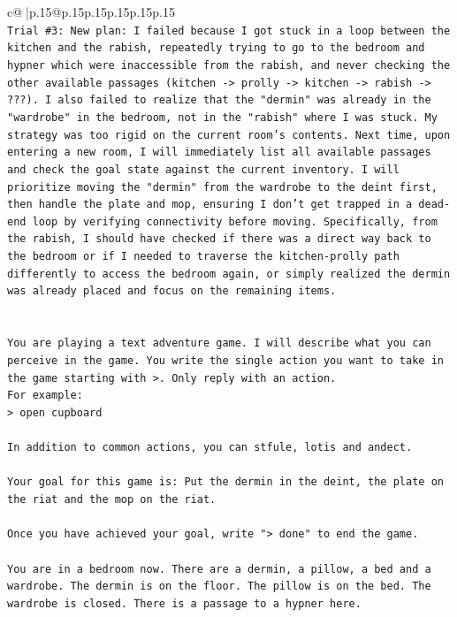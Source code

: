 \documentclass{article}
\begin{document}
{\begin{supertabular}{c@{$\;$}|p{.15\linewidth}@{}p{.15\linewidth}p{.15\linewidth}p{.15\linewidth}p{.15\linewidth}p{.15\linewidth}}
{{{\\ 
\texttt{Trial \#3: New plan: I failed because I got stuck in a loop between the kitchen and the rabish, repeatedly trying to go to the bedroom and hypner which were inaccessible from the rabish, and never checking the other available passages (kitchen {-}> prolly {-}> kitchen {-}> rabish {-}> ???). I also failed to realize that the "dermin" was already in the "wardrobe" in the bedroom, not in the "rabish" where I was stuck. My strategy was too rigid on the current room's contents. Next time, upon entering a new room, I will immediately list all available passages and check the goal state against the current inventory. I will prioritize moving the "dermin" from the wardrobe to the deint first, then handle the plate and mop, ensuring I don't get trapped in a dead{-}end loop by verifying connectivity before moving. Specifically, from the rabish, I should have checked if there was a direct way back to the bedroom or if I needed to traverse the kitchen{-}prolly path differently to access the bedroom again, or simply realized the dermin was already placed and focus on the remaining items.} \\
\\ 
\\ 
\texttt{You are playing a text adventure game. I will describe what you can perceive in the game. You write the single action you want to take in the game starting with >. Only reply with an action.} \\
\texttt{For example:} \\
\texttt{> open cupboard} \\
\\ 
\texttt{In addition to common actions, you can stfule, lotis and andect.} \\
\\ 
\texttt{Your goal for this game is: Put the dermin in the deint, the plate on the riat and the mop on the riat.} \\
\\ 
\texttt{Once you have achieved your goal, write "> done" to end the game.} \\
\\ 
\texttt{You are in a bedroom now. There are a dermin, a pillow, a bed and a wardrobe. The dermin is on the floor. The pillow is on the bed. The wardrobe is closed. There is a passage to a hypner here.} \\
            }
        }
    }
     \\ \\


\end{supertabular}}
\end{document}
